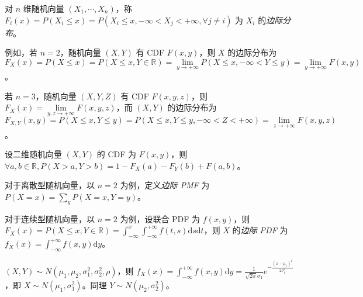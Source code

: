 \documentclass[../main.tex]{subfiles}
\begin{document}
对 $n$ 维随机向量 $(X_1,\cdots,X_n)$，称 $F_i(x)=P(X_i\leq x)=P(X_i\leq x,-\infty<X_j<+\infty,\forall j\neq i)$ 为 $X_i$ 的\emph{边际分布}。

例如，若 $n=2$，随机向量 $(X,Y)$ 有 CDF $F(x,y)$，则 $X$ 的边际分布为 $F_X(x)=P(X\leq x)=P(X\leq x,Y\in\mathbb R)=\lim\limits_{y\rightarrow+\infty}P(X\leq x,-\infty<Y\leq y)=\lim\limits_{y\rightarrow+\infty}F(x,y)$。

若 $n=3$，随机向量 $(X,Y,Z)$ 有 CDF $F(x,y,z)$，则 $F_X(x)=\lim\limits_{y,z\rightarrow+\infty}F(x,y,z)$，而 $(X,Y)$ 的边际分布为 $F_{X,Y}(x,y)=P(X\leq x,Y\leq y)=P(X\leq x,Y\leq y,-\infty<Z<+\infty)=\lim\limits_{z\rightarrow+\infty}F(x,y,z)$。

\begin{example}
    设二维随机向量 $(X,Y)$ 的 CDF 为 $F(x,y)$，则 $\forall a,b\in\mathbb R,P(X>a,Y>b)=1-F_X(a)-F_Y(b)+F(a,b)$。
\end{example}

对于离散型随机向量，以 $n=2$ 为例，定义\emph{边际 PMF} 为 $P(X=x)=\sum\limits_y{P(X=x,Y=y)}$。

对于连续型随机向量，以 $n=2$ 为例，设联合 PDF 为 $f(x,y)$，则 $F_X(x)=P(X\leq x,Y\in\mathbb R)=\int_{-\infty}^x\int_{-\infty}^{+\infty}f(t,s)\mathrm ds\mathrm dt$，则 $X$ 的\emph{边际 PDF} 为 $f_X(x)=\int_{-\infty}^{+\infty}f(x,y)\mathrm dy$。

\begin{example}
    $(X,Y)\sim N(\mu_1,\mu_2,\sigma_1^2,\sigma_2^2,\rho)$，则 $f_X(x)=\int_{-\infty}^{+\infty}f(x,y)\mathrm dy=\frac1{\sqrt{2\pi}\sigma_1}e^{-\frac{(x-\mu_1)^2}{2\sigma_1^2}}$，即 $X\sim N(\mu_1,\sigma_1^2)$。同理 $Y\sim N(\mu_2,\sigma_2^2)$。
\end{example}
\end{document}
